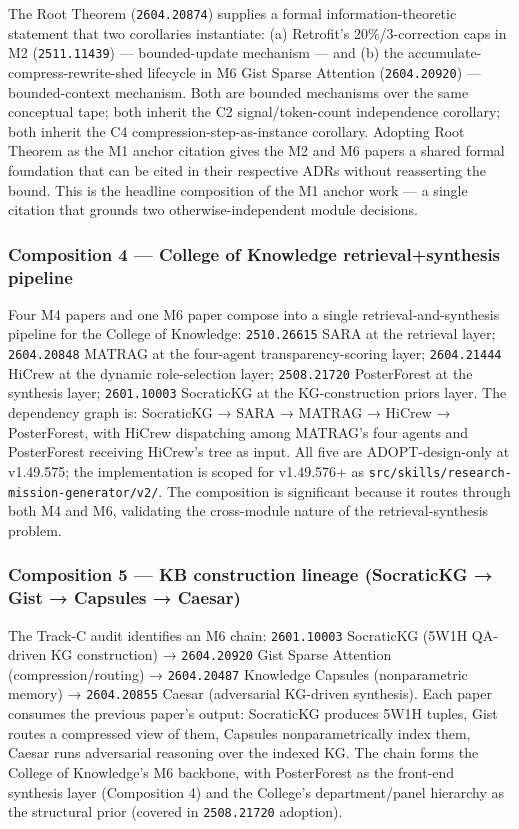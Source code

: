 \documentclass[11pt,letterpaper]{article}
\newcommand{\arxivid}[1]{\texttt{\textcolor{accent}{#1}}}
\begin{document}
The Root Theorem (\arxivid{2604.20874}) supplies a formal
information-theoretic statement that two corollaries instantiate: (a)
Retrofit's 20\%/3-correction caps in M2 (\arxivid{2511.11439}) ---
bounded-update mechanism --- and (b) the
accumulate-compress-rewrite-shed lifecycle in M6 Gist Sparse Attention
(\arxivid{2604.20920}) --- bounded-context mechanism. Both are bounded
mechanisms over the same conceptual tape; both inherit the C2
signal/token-count independence corollary; both inherit the C4
compression-step-as-instance corollary. Adopting Root Theorem as the M1
anchor citation gives the M2 and M6 papers a shared formal foundation
that can be cited in their respective ADRs without reasserting the
bound. This is the headline composition of the M1 anchor work --- a
single citation that grounds two otherwise-independent module decisions.

\subsubsection{Composition 4 --- College of Knowledge
retrieval+synthesis
pipeline}

Four M4 papers and one M6 paper compose into a single
retrieval-and-synthesis pipeline for the College of Knowledge:
\arxivid{2510.26615} SARA at the retrieval layer; \arxivid{2604.20848}
MATRAG at the four-agent transparency-scoring layer; \arxivid{2604.21444}
HiCrew at the dynamic role-selection layer; \arxivid{2508.21720}
PosterForest at the synthesis layer; \arxivid{2601.10003} SocraticKG at
the KG-construction priors layer. The dependency graph is: SocraticKG →
SARA → MATRAG → HiCrew → PosterForest, with HiCrew dispatching among
MATRAG's four agents and PosterForest receiving HiCrew's tree as input.
All five are ADOPT-design-only at v1.49.575; the implementation is
scoped for v1.49.576+ as
\texttt{src/skills/research-mission-generator/v2/}. The composition is
significant because it routes through both M4 and M6, validating the
cross-module nature of the retrieval-synthesis problem.

\subsubsection{Composition 5 --- KB construction lineage (SocraticKG →
Gist → Capsules →
Caesar)}

The Track-C audit identifies an M6 chain: \arxivid{2601.10003} SocraticKG
(5W1H QA-driven KG construction) → \arxivid{2604.20920} Gist Sparse
Attention (compression/routing) → \arxivid{2604.20487} Knowledge Capsules
(nonparametric memory) → \arxivid{2604.20855} Caesar (adversarial
KG-driven synthesis). Each paper consumes the previous paper's output:
SocraticKG produces 5W1H tuples, Gist routes a compressed view of them,
Capsules nonparametrically index them, Caesar runs adversarial reasoning
over the indexed KG. The chain forms the College of Knowledge's M6
backbone, with PosterForest as the front-end synthesis layer
(Composition 4) and the College's department/panel hierarchy as the
structural prior (covered in \arxivid{2508.21720} adoption).
\end{document}
